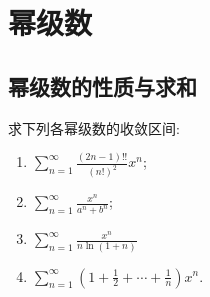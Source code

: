 \chapter{幂级数}

\section{幂级数的性质与求和}

\begin{problem}
    求下列各幂级数的收敛区间:
    \begin{enumerate}
        \item \(\sum_{n=1}^{\infty} \frac{(2n-1)!!}{(n!)^2} x^n\);
        \item \(\sum_{n=1}^{\infty} \frac{x^{n}}{a^{n} + b^{n}}\);
        \item \(\sum_{n=1}^{\infty} \frac{x^n}{n \ln(1+n)}\)
        \item \(\sum_{n=1}^{\infty} \left(1 + \frac{1}{2} + \cdots +
            \frac{1}{n}\right) x^n\).
    \end{enumerate}
\end{problem}


